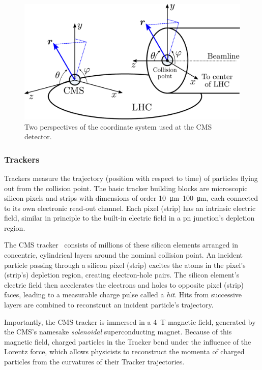 \documentclass[11pt, a4paper]{article}
\begin{document}
\begin{figure}[htb!]
    \centering
    \includegraphics[width=0.9\linewidth]{vector/cms-coordinate-system.pdf}
    \caption{Two perspectives of the coordinate system used at the CMS detector.}
    \label{fig:cms-coordinate-system}
\end{figure}

\subsubsection{Trackers}
Trackers measure the trajectory (position with respect to time) of particles flying out from the collision point.
The basic tracker building blocks are microscopic silicon pixels and strips with dimensions of order \SIrange{10}{100}{\micro \meter}, each connected to its own electronic read-out channel.
Each pixel (strip) has an intrinsic electric field, similar in principle to the built-in electric field in a pn junction's depletion region.

The CMS tracker~\cite{tracker-tdr} consists of millions of these silicon elements arranged in concentric, cylindrical layers around the nominal collision point.
An incident particle passing through a silicon pixel (strip) excites the atoms in the pixel's (strip's) depletion region, creating electron-hole pairs.
The silicon element's electric field then accelerates the electrons and holes to opposite pixel (strip) faces, leading to a measurable charge pulse called a \textit{hit}.
Hits from successive layers are combined to reconstruct an incident particle's trajectory.

Importantly, the CMS tracker is immersed in a \SI{4}{\tesla} magnetic field, generated by the CMS's namesake \textit{solenoidal} superconducting magnet.
Because of this magnetic field, charged particles in the Tracker bend under the influence of the Lorentz force, which allows physicists to reconstruct the momenta of charged particles from the curvatures of their Tracker trajectories.
\end{document}
